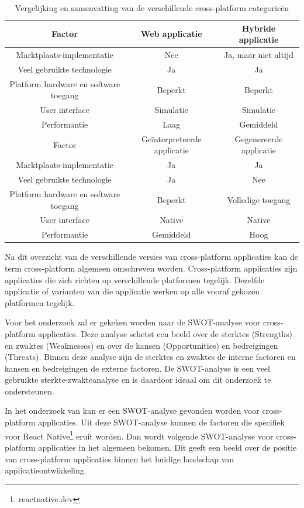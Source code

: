 \begin{table}[H]
    \caption{Vergelijking en samenvatting van de verschillende cross-platform categorieën}
    \begin{tabular}{ |c||c|c| }
        \hline
        Factor&Web applicatie&Hybride applicatie\\
        \hline
        Marktplaats-implementatie&Nee&Ja, maar niet altijd\\
        Veel gebruikte technologie&Ja&Ja\\
        Platform hardware en software toegang&Beperkt&Beperkt\\
        User interface&Simulatie&Simulatie\\
        Performantie&Laag&Gemiddeld\\
        \hline
        \hline
        Factor&Geïnterpreteerde applicatie&Gegenereerde applicatie\\
        \hline
        Marktplaats-implementatie&Ja&Ja\\
        Veel gebruikte technologie&Ja&Nee\\
        Platform hardware en software toegang&Beperkt&Volledige toegang\\
        User interface&Native&Native\\
        Performantie&Gemiddeld&Hoog\\
        \hline
    \end{tabular}
    \label{tab:svzCP}
\end{table}

Na dit overzicht van de verschillende versies van cross-platform applicaties kan de term cross-platform algemeen omschreven worden. Cross-platform applicaties zijn applicaties die zich richten op verschillende platformen tegelijk. Dezelfde applicatie of varianten van die applicatie werken op alle vooraf gekozen platformen tegelijk. 

Voor het onderzoek zal er gekeken worden naar de SWOT-analyse voor cross-platform applicaties. Deze analyse schetst een beeld over de sterktes (Strengths) en zwaktes (Weaknesses) en over de kansen (Opportunities) en bedreigingen (Threats). Binnen deze analyse zijn de sterktes en zwaktes de interne factoren en kansen en bedreigingen de externe factoren.\autocite{Leigh2010} De SWOT-analyse is een veel gebruikte sterkte-zwakteanalyse en is daardoor ideaal om dit onderzoek te ondersteunen.

In het onderzoek van \textcite{Nivanaho2019} kan er een SWOT-analyse gevonden worden voor cross-platform applicaties. Uit deze SWOT-analyse kunnen de factoren die specifiek voor React Native\footnote{reactnative.dev} eruit worden. Dan wordt volgende SWOT-analyse voor cross-platform applicaties in het algemeen bekomen. Dit geeft een beeld over de positie van cross-platform applicaties binnen het huidige landschap van applicatieontwikkeling.


